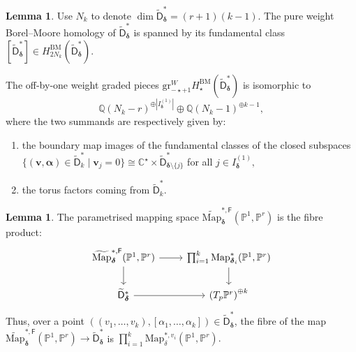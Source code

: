 \documentclass[12pt,reqno]{amsart}
\theoremstyle{definition}
\theoremstyle{definition}
\theoremstyle{definition}
\theoremstyle{definition}
\newtheorem{lemma}[theorem]{Lemma}
\newcommand{\gr}{\mathrm{gr}}
\begin{document}
\begin{lemma}\label{lem:Dtilstar}
  Use $N_{k}$ to denote $\dim \widetilde{\mathsf{D}}^*_{\boldsymbol{\delta}} = (r+1)(k-1).$ The pure weight Borel--Moore homology of $\widetilde{\mathsf{D}}^*_{\boldsymbol{\delta}}$ is spanned by its fundamental class $[\widetilde{\mathsf{D}}^*_{\boldsymbol{\delta}}]\in H^{\mathrm{BM}}_{2 N_{k}}(\widetilde{\mathsf{D}}^*_{\boldsymbol{\delta}}).$

  The off-by-one weight graded pieces $\gr^{W}_{-\star+1} H^{\mathrm{BM}}_\star(\widetilde{\mathsf{D}}^*_{\boldsymbol{\delta}})$ is isomorphic to $$\mathbb{Q}(N_{k}-r)^{\oplus |I_{\boldsymbol{\delta}}^{(1)}|}\oplus \mathbb{Q}(N_{k}-1)^{\oplus k-1},$$ where the two summands are respectively given by: \begin{enumerate}
    \item the boundary map images of the fundamental classes of the closed subspaces $\{(\boldsymbol{v}, \boldsymbol{\alpha})\in \widetilde{\mathsf{D}}^*_{k}\mid \boldsymbol{v}_j = 0\}\cong \mathbb{C}^\star\times \widetilde{\mathsf{D}}^*_{{\boldsymbol{\delta}}\setminus \{j\}}$ for all $j\in I_{\boldsymbol{\delta}}^{(1)},$
    \item the torus factors coming from $\widetilde{\mathsf{D}}_k^*$.
  \end{enumerate}
\end{lemma}


\begin{lemma}\label{lem:fibDF} The parametrised mapping space $\widetilde{\mathrm{Map}}_{\boldsymbol{\delta}}^{*, \mathsf{F}}(\mathbb{P}^1, \mathbb{P}^r)$ is the fibre product:
  \[\begin{tikzcd}
	{\widetilde{\mathrm{Map}}_{\boldsymbol{\delta}}^{*, \mathsf{F}}(\mathbb{P}^1, \mathbb{P}^r)} & {\prod_{i=1}^k \mathrm{Map}_{\boldsymbol{\delta}_i}^{*}(\mathbb{P}^1, \mathbb{P}^r)} \\
	{\widetilde{\mathsf{D}}_{\boldsymbol{\delta}}^*} & {\left(T_p \mathbb{P}^r\right)^{\oplus k}}
	\arrow[from=1-1, to=1-2]
	\arrow[from=1-1, to=2-1]
	\arrow[from=1-2, to=2-2]
	\arrow[from=2-1, to=2-2]
\end{tikzcd}\]
Thus, over a point \({((v_1,\dots, v_k), [\alpha_1,\dots, \alpha_k])\in \widetilde{\mathsf{D}}_{\boldsymbol{\delta}}^*}\), the fibre of the map $\widetilde{\mathrm{Map}}_{\boldsymbol{\delta}}^{*, \mathsf{F}}(\mathbb{P}^1, \mathbb{P}^r)\to {\widetilde{\mathsf{D}}}^*_{\boldsymbol{\delta}}$ is $\prod_{i=1}^k \mathrm{Map}_{{\delta}}^{*, v_i}(\mathbb{P}^1, \mathbb{P}^r).$
\end{lemma}
\end{document}
